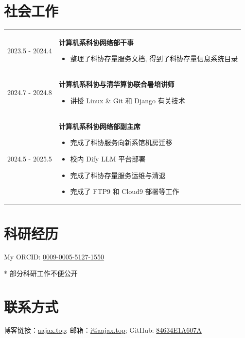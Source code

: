 \documentclass[a4paper, 10pt]{article}
\begin{document}
\section*{社会工作}
\noindent
\begin{tabular}{p{}p{}}
    2023.5 - 2024.4 & \textbf{计算机系科协网络部干事}
        \fontsize{8pt}{10pt}\selectfont
        \begin{itemize}[left=0pt,topsep=0pt,partopsep=0pt,parsep=0pt,itemsep=0pt]
            \item 整理了科协存量服务文档, 得到了科协存量信息系统目录
        \end{itemize} \\

    2024.7 - 2024.8 & \textbf{计算机系科协与清华算协联合暑培讲师}
        \fontsize{8pt}{10pt}\selectfont
        \begin{itemize}[left=0pt,topsep=0pt,partopsep=0pt,parsep=0pt,itemsep=0pt]
            \item 讲授 Linux \& Git 和 Django 有关技术
        \end{itemize} \\

    2024.5 - 2025.5 & \textbf{计算机系科协网络部副主席}
        \fontsize{8pt}{10pt}\selectfont
        \begin{itemize}[left=0pt,topsep=0pt,partopsep=0pt,parsep=0pt,itemsep=0pt]
            \item 完成了科协服务向新系馆机房迁移
            \item 校内 Dify LLM 平台部署
            \item 完成了科协存量服务运维与清退
            \item 完成了 FTP9 和 Cloud9 部署等工作
        \end{itemize}
\end{tabular}

\section*{科研经历}
\noindent
My ORCID: \href{https://orcid.org/0009-0005-5127-1550}{0009-0005-5127-1550}

\noindent\fontsize{8pt}{10pt}\selectfont
* 部分科研工作不便公开

\section*{联系方式}
\noindent 博客链接：\href{https://aajax.top}{aajax.top}; 邮箱：\href{mailto:i@aajax.top}{i@aajax.top}; GitHub: \href{https://github.com/84634E1A607A/}{84634E1A607A}
\end{document}
